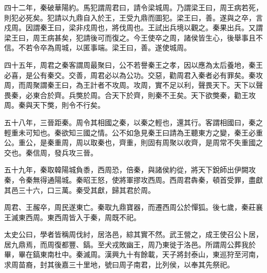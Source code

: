 四十二年，秦破華陽約。馬犯謂周君曰，請令梁城周。乃謂梁王曰，周王病若死，則犯必死矣。犯請以九鼎自入於王，王受九鼎而圖犯。梁王曰，善。遂與之卒，言戍周。因謂秦王曰，梁非戍周也，將伐周也。王試出兵境以觀之。秦果出兵。又謂梁王曰，周王病甚矣，犯請後可而復之。今王使卒之周，諸侯皆生心，後舉事且不信。不若令卒為周城，以匿事端。梁王曰，善。遂使城周。

四十五年，周君之秦客謂周最聚曰，公不若譽秦王之孝，因以應為太后養地，秦王必喜，是公有秦交。交善，周君必以為公功。交惡，勸周君入秦者必有罪矣。秦攻周，而周聚謂秦王曰，為王計者不攻周。攻周，實不足以利，聲畏天下。天下以聲畏秦，必東合於齊。兵獘於周。合天下於齊，則秦不王矣。天下欲獘秦，勸王攻周。秦與天下獘，則令不行矣。

五十八年，三晉距秦。周令其相國之秦，以秦之輕也，還其行。客謂相國曰，秦之輕重未可知也。秦欲知三國之情。公不如急見秦王曰請為王聽東方之變，秦王必重公。重公，是秦重周，周以取秦也，齊重，則固有周聚以收齊，是周常不失重國之交也。秦信周，發兵攻三晉。

五十九年，秦取韓陽城負黍，西周恐，倍秦，與諸侯約從，將天下銳師出伊闕攻秦，令秦無得通陽城。秦昭王怒，使將軍摎攻西周。西周君犇秦，頓首受罪，盡獻其邑三十六，口三萬。秦受其獻，歸其君於周。

周君、王赧卒，周民遂東亡。秦取九鼎寶器，而遷西周公於憚狐。後七歲，秦莊襄王滅東西周。東西周皆入于秦，周既不祀。

太史公曰，學者皆稱周伐紂，居洛邑，綜其實不然。武王營之，成王使召公卜居，居九鼎焉，而周復都豐、鎬。至犬戎敗幽王，周乃東徙于洛邑。所謂周公葬我於畢，畢在鎬東南杜中。秦滅周。漢興九十有餘載，天子將封泰山，東巡狩至河南，求周苗裔，封其後嘉三十里地，號曰周子南君，比列侯，以奉其先祭祀。